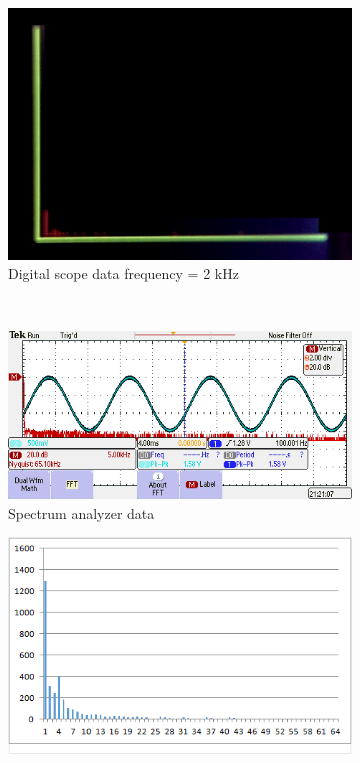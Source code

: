 \documentclass[a4paper]{article}
\newlength{\pic}
\begin{document}
\begin{figure}[htp]
\begin{subfigure}[H]{\pica}
	\includegraphics[width=\pica]{Images/FFT2000}
	\caption{Digital scope data frequency = 2 kHz}
	\end{subfigure}	
	\\
	\begin{subfigure}[H]{\picb}
	\includegraphics[width=\picb]{oscilloscope/fft100}
	\caption{Spectrum analyzer data}
	\end{subfigure}
	\begin{subfigure}[H]{\picc}
	\includegraphics[width=\picc]{Plots/P3_FFT100}

\end{subfigure}
\end{figure}
\end{document}

